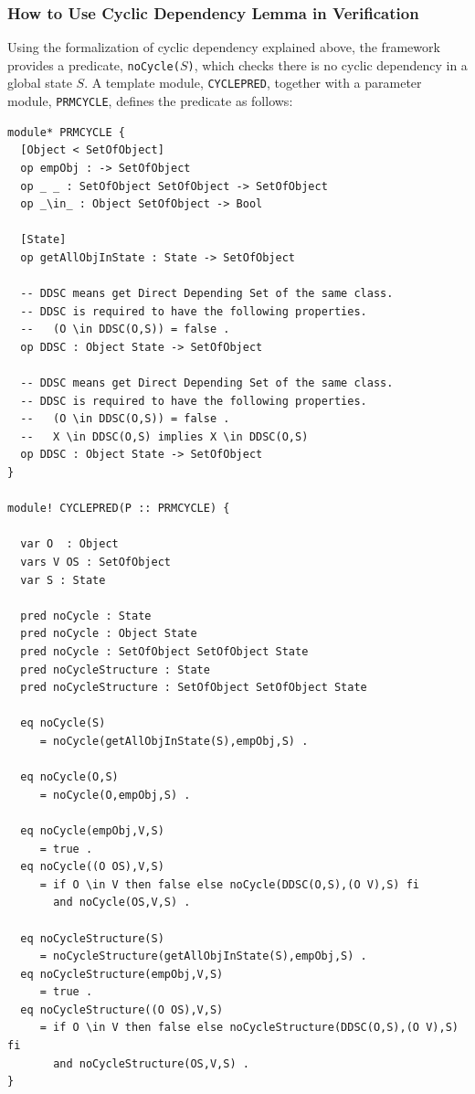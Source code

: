 \documentclass[12pt]{report}
\newcommand{\stt}[1]{{\small{\tt {#1}}}}
\begin{document}
\subsubsection*{How to Use Cyclic Dependency Lemma in Verification}
Using the formalization of cyclic dependency explained above, the
framework provides a predicate, \stt{noCycle($S$)}, which checks there
is no cyclic dependency in a global state $S$. A template module,
{\tt CYCLEPRED}, together with a parameter module, {\tt PRMCYCLE},
defines the predicate as follows:
\begin{verbatim}
module* PRMCYCLE {
  [Object < SetOfObject]
  op empObj : -> SetOfObject
  op _ _ : SetOfObject SetOfObject -> SetOfObject
  op _\in_ : Object SetOfObject -> Bool

  [State]
  op getAllObjInState : State -> SetOfObject

  -- DDSC means get Direct Depending Set of the same class.
  -- DDSC is required to have the following properties.
  --   (O \in DDSC(O,S)) = false .
  op DDSC : Object State -> SetOfObject

  -- DDSC means get Direct Depending Set of the same class.
  -- DDSC is required to have the following properties.
  --   (O \in DDSC(O,S)) = false .
  --   X \in DDSC(O,S) implies X \in DDSC(O,S)
  op DDSC : Object State -> SetOfObject
}

module! CYCLEPRED(P :: PRMCYCLE) {

  var O  : Object
  vars V OS : SetOfObject
  var S : State

  pred noCycle : State
  pred noCycle : Object State
  pred noCycle : SetOfObject SetOfObject State
  pred noCycleStructure : State
  pred noCycleStructure : SetOfObject SetOfObject State

  eq noCycle(S)
     = noCycle(getAllObjInState(S),empObj,S) .

  eq noCycle(O,S)
     = noCycle(O,empObj,S) .

  eq noCycle(empObj,V,S)
     = true .
  eq noCycle((O OS),V,S)
     = if O \in V then false else noCycle(DDSC(O,S),(O V),S) fi
       and noCycle(OS,V,S) .

  eq noCycleStructure(S)
     = noCycleStructure(getAllObjInState(S),empObj,S) .
  eq noCycleStructure(empObj,V,S)
     = true .
  eq noCycleStructure((O OS),V,S)
     = if O \in V then false else noCycleStructure(DDSC(O,S),(O V),S) fi
       and noCycleStructure(OS,V,S) .
}
\end{verbatim}
\end{document}
